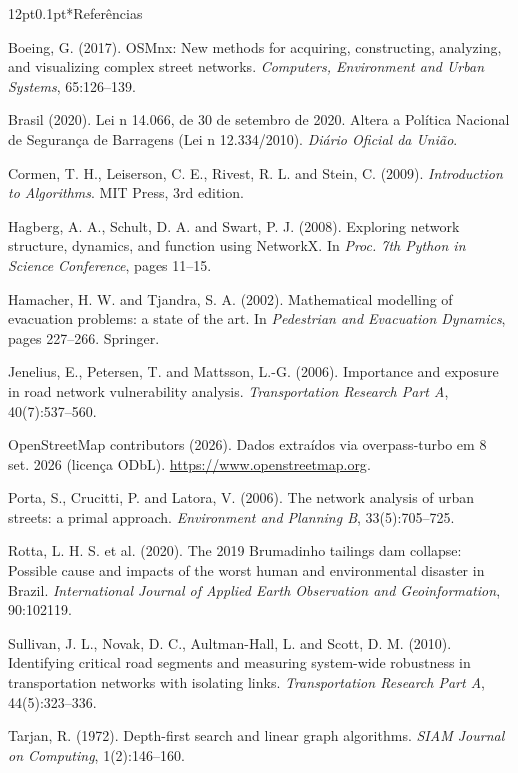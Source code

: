 \documentclass[12pt,a4paper]{article}
\makeatletter
\renewcommand\section{\@startsection{section}{1}{\z@}%
  {12pt}{0.1pt}{\normalfont\fontsize{13}{15}\selectfont\bfseries}}
\newenvironment{referencias}%
  {\section*{Referências}\begin{list}{}{\leftmargin=0.5cm\itemindent=-0.5cm%
   \labelwidth=0pt\labelsep=0pt\itemsep=0pt\parsep=0pt\topsep=0pt}\setlength{\parskip}{6pt}}%
  {\end{list}}
\newcommand{\referencia}{\item\relax}
\makeatother
\begin{document}
\begin{referencias}
\referencia Boeing, G. (2017). OSMnx: New methods for acquiring, constructing, analyzing, and visualizing complex street networks. \emph{Computers, Environment and Urban Systems}, 65:126--139.

\referencia Brasil (2020). Lei n\textordmasculine{} 14.066, de 30 de setembro de 2020. Altera a Política Nacional de Segurança de Barragens (Lei n\textordmasculine{} 12.334/2010). \emph{Diário Oficial da União}.

\referencia Cormen, T. H., Leiserson, C. E., Rivest, R. L. and Stein, C. (2009). \emph{Introduction to Algorithms}. MIT Press, 3rd edition.

\referencia Hagberg, A. A., Schult, D. A. and Swart, P. J. (2008). Exploring network structure, dynamics, and function using NetworkX. In \emph{Proc. 7th Python in Science Conference}, pages 11--15.

\referencia Hamacher, H. W. and Tjandra, S. A. (2002). Mathematical modelling of evacuation problems: a state of the art. In \emph{Pedestrian and Evacuation Dynamics}, pages 227--266. Springer.

\referencia Jenelius, E., Petersen, T. and Mattsson, L.-G. (2006). Importance and exposure in road network vulnerability analysis. \emph{Transportation Research Part A}, 40(7):537--560.

\referencia OpenStreetMap contributors (2026). Dados extraídos via overpass-turbo em 8 set. 2026 (licença ODbL). \url{https://www.openstreetmap.org}.

\referencia Porta, S., Crucitti, P. and Latora, V. (2006). The network analysis of urban streets: a primal approach. \emph{Environment and Planning B}, 33(5):705--725.

\referencia Rotta, L. H. S. et al. (2020). The 2019 Brumadinho tailings dam collapse: Possible cause and impacts of the worst human and environmental disaster in Brazil. \emph{International Journal of Applied Earth Observation and Geoinformation}, 90:102119.

\referencia Sullivan, J. L., Novak, D. C., Aultman-Hall, L. and Scott, D. M. (2010). Identifying critical road segments and measuring system-wide robustness in transportation networks with isolating links. \emph{Transportation Research Part A}, 44(5):323--336.

\referencia Tarjan, R. (1972). Depth-first search and linear graph algorithms. \emph{SIAM Journal on Computing}, 1(2):146--160.
\end{referencias}
\end{document}

